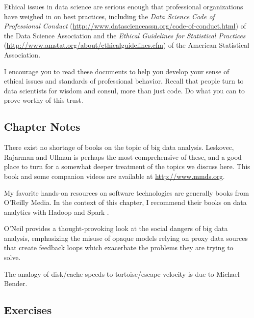 \documentclass[10pt]{article}
\begin{document}
\begin{enumerate}
Ethical issues in data science are serious enough that professional organizations have weighed in on best practices, including the \textit{Data Science Code of Professional Conduct} (\href{http://www.datascienceassn.org/code-of-conduct.html}{http://www.datascienceassn.org/code-of-conduct.html}) of the Data Science Association and the \textit{Ethical Guidelines for Statistical Practices} (\href{http://www.amstat.org/about/ethicalguidelines.cfm}{http://www.amstat.org/about/ethicalguidelines.cfm}) of the American Statistical Association.

I encourage you to read these documents to help you develop your sense of ethical issues and standards of professional behavior. Recall that people turn to data scientists for wisdom and consul, more than just code. Do what you can to prove worthy of this trust.

\subsection{Chapter Notes}
There exist no shortage of books on the topic of big data analysis. Leskovec, Rajarman and Ullman \cite{LRU14} is perhaps the most comprehensive of these, and a good place to turn for a somewhat deeper treatment of the topics we discuss here. This book and some companion videos are available at \url{http://www.mmds.org}.

My favorite hands-on resources on software technologies are generally books from O'Reilly Media. In the context of this chapter, I recommend their books on data analytics with Hadoop \cite{BK16} and Spark \cite{RLOW15}.

O'Neil \cite{ON16} provides a thought-provoking look at the social dangers of big data analysis, emphasizing the misuse of opaque models relying on proxy data sources that create feedback loops which exacerbate the problems they are trying to solve.

The analogy of disk/cache speeds to tortoise/escape velocity is due to Michael Bender.

\subsection{Exercises}

\end{enumerate}
\end{document}
